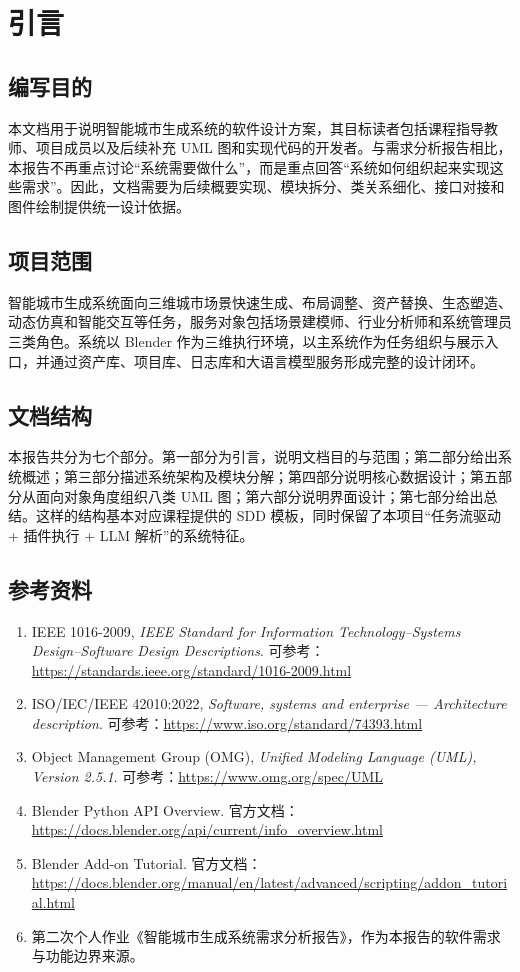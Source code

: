 \section{引言}

\subsection{编写目的}
本文档用于说明智能城市生成系统的软件设计方案，其目标读者包括课程指导教师、项目成员以及后续补充 UML 图和实现代码的开发者。与需求分析报告相比，本报告不再重点讨论“系统需要做什么”，而是重点回答“系统如何组织起来实现这些需求”。因此，文档需要为后续概要实现、模块拆分、类关系细化、接口对接和图件绘制提供统一设计依据。

\subsection{项目范围}
智能城市生成系统面向三维城市场景快速生成、布局调整、资产替换、生态塑造、动态仿真和智能交互等任务，服务对象包括场景建模师、行业分析师和系统管理员三类角色。系统以 Blender 作为三维执行环境，以主系统作为任务组织与展示入口，并通过资产库、项目库、日志库和大语言模型服务形成完整的设计闭环。

\subsection{文档结构}
本报告共分为七个部分。第一部分为引言，说明文档目的与范围；第二部分给出系统概述；第三部分描述系统架构及模块分解；第四部分说明核心数据设计；第五部分从面向对象角度组织八类 UML 图；第六部分说明界面设计；第七部分给出总结。这样的结构基本对应课程提供的 SDD 模板，同时保留了本项目“任务流驱动 + 插件执行 + LLM 解析”的系统特征。

\subsection{参考资料}
\begin{enumerate}[label=\arabic*.]
    \item IEEE 1016-2009, \textit{IEEE Standard for Information Technology--Systems Design--Software Design Descriptions}. 可参考：\url{https://standards.ieee.org/standard/1016-2009.html}
    \item ISO/IEC/IEEE 42010:2022, \textit{Software, systems and enterprise --- Architecture description}. 可参考：\url{https://www.iso.org/standard/74393.html}
    \item Object Management Group (OMG), \textit{Unified Modeling Language (UML), Version 2.5.1}. 可参考：\url{https://www.omg.org/spec/UML}
    \item Blender Python API Overview. 官方文档：\url{https://docs.blender.org/api/current/info_overview.html}
    \item Blender Add-on Tutorial. 官方文档：\url{https://docs.blender.org/manual/en/latest/advanced/scripting/addon_tutorial.html}
    \item 第二次个人作业《智能城市生成系统需求分析报告》，作为本报告的软件需求与功能边界来源。
\end{enumerate}

